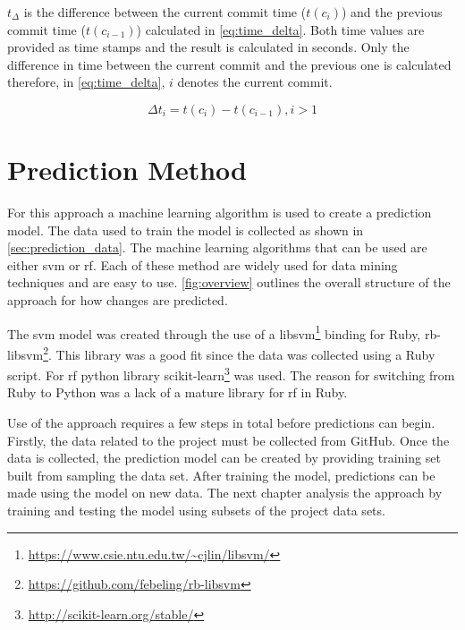 $t_\Delta$ is the difference between the current commit time ($t(c_i)$) and the previous commit time ($t(c_{i-1})$) calculated in \autoref{eq:time_delta}. Both time values are provided as time stamps and the result is calculated in seconds. Only the difference in time between the current commit and the previous one is calculated therefore, in \autoref{eq:time_delta}, $i$ denotes the current commit.

\begin{equation}
\label{eq:time_delta}
\Delta t_{i} = t(c_i) - t(c_{i-1}), i > 1
\end{equation}

\section{Prediction Method}
\label{sec:prediction_method}


For this approach a machine learning algorithm is used to create a prediction model. The data used to train the model is collected as shown in \autoref{sec:prediction_data}. The machine learning algorithms that can be used are either \gls{svm} or \gls{rf}. Each of these method are widely used for data mining techniques and are easy to use. \autoref{fig:overview} outlines the overall structure of the approach for how changes are predicted.


The \gls{svm} model was created through the use of a libsvm\footnote{\url{https://www.csie.ntu.edu.tw/~cjlin/libsvm/}} binding for Ruby, rb-libsvm\footnote{\url{https://github.com/febeling/rb-libsvm}}. This library was a good fit since the data was collected using a Ruby script. For \gls{rf} python library scikit-learn\footnote{\url{http://scikit-learn.org/stable/}} was used. The reason for switching from Ruby to Python was a lack of a mature library for \gls{rf} in Ruby.

Use of the approach requires a few steps in total before predictions can begin. Firstly, the data related to the project must be collected from GitHub. Once the data is collected, the prediction model can be created by providing training set built from sampling the data set. After training the model, predictions can be made using the model on new data. The next chapter analysis the approach by training and testing the model using subsets of the project data sets.